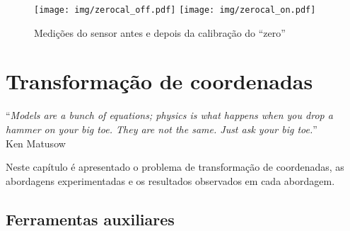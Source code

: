 \documentclass[brazil,pagestart=firstchapter]{abnt}
\begin{document}
\begin{figure}[h]
\centering
\texttt{[image: img/zerocal\_off.pdf]}
\texttt{[image: img/zerocal\_on.pdf]}
\caption{Medições do sensor antes e depois da calibração do ``zero''}
\label{fig:zerocal}
\end{figure}


%
%


%
%


\chapter{Transformação de coordenadas}
\label{cap:coordenadas}


\vfill{}
\begin{flushright}{}
``\emph{Models are a bunch of equations; physics is what happens when you
drop a hammer on your big toe. They are not the same. Just ask your big
toe.}''\\
{\small Ken Matusow}
\end{flushright}{\small \par}
\vfill{}

Neste capítulo é apresentado o problema de transformação de coordenadas, as
abordagens experimentadas e os resultados observados em cada abordagem.
\newpage


\section{Ferramentas auxiliares}
\label{sec:ferramentas}
\end{document}

